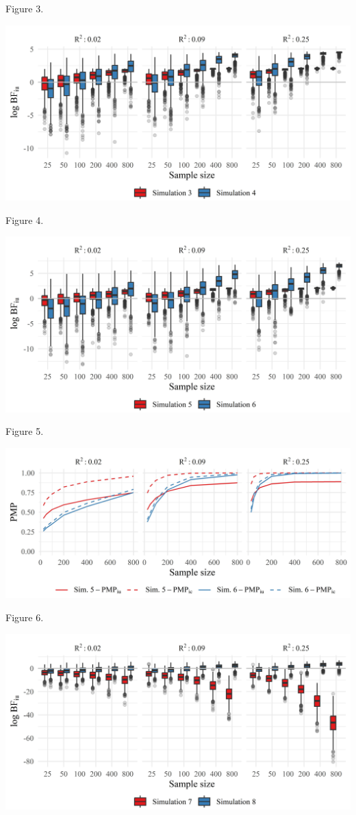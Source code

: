 \documentclass[
]{interact}
\begin{document}
Figure 3.

\includegraphics[width=1\textwidth,height=\textheight]{figures/figure-3.jpeg}

Figure 4.

\includegraphics[width=1\textwidth,height=\textheight]{figures/figure-5.jpeg}

Figure 5.

\includegraphics[width=1\textwidth,height=\textheight]{figures/figure-6.jpeg}

Figure 6.

\includegraphics[width=1\textwidth,height=\textheight]{figures/figure-7.jpeg}
\end{document}
